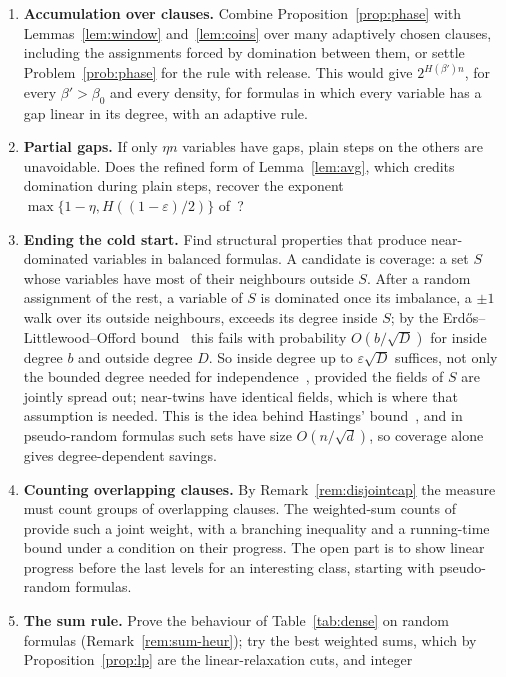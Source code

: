 \documentclass[11pt,a4paper]{article}
\theoremstyle{remark}
\begin{document}
\begin{enumerate}
 \item \textbf{Accumulation over clauses.} Combine
 Proposition~\ref{prop:phase} with Lemmas~\ref{lem:window} and~\ref{lem:coins}
 over many adaptively chosen clauses, including the assignments forced by
 domination between them, or settle Problem~\ref{prob:phase} for the rule with
 release. This would give $2^{H(\beta')n}$, for every $\beta'>\beta_0$ and every
 density, for formulas in which every variable has a gap linear in its degree,
 with an adaptive rule.
 \item \textbf{Partial gaps.} If only $\eta n$ variables have gaps, plain steps
 on the others are unavoidable. Does the refined form of Lemma~\ref{lem:avg},
 which credits domination during plain steps, recover the exponent
 $\max\{1-\eta,H((1-\varepsilon)/2)\}$ of~\cite[Theorem~11]{N3}?
 \item \textbf{Ending the cold start.} Find structural properties that produce
 near-dominated variables in balanced formulas. A candidate is coverage: a set
 $S$ whose variables have most of their neighbours outside $S$. After a random
 assignment of the rest, a variable of $S$ is dominated once its imbalance, a
 $\pm1$ walk over its outside neighbours, exceeds its degree inside $S$; by the
 Erd\H{o}s--Littlewood--Offord bound~\cite{Erd45} this fails with probability
 $O(b/\sqrt D)$ for inside degree $b$ and outside degree $D$. So inside degree
 up to $\varepsilon\sqrt D$ suffices, not only the bounded degree needed for
 independence~\cite{N5}, provided the fields of $S$ are jointly spread out;
 near-twins have identical fields, which is where that assumption is needed.
 This is the idea behind Hastings' bound~\cite{Has16}, and in pseudo-random
 formulas such sets have size $O(n/\sqrt d)$, so coverage alone gives
 degree-dependent savings.
 \item \textbf{Counting overlapping clauses.} By Remark~\ref{rem:disjointcap}
 the measure must count groups of overlapping clauses. The weighted-sum counts
 of~\cite{N5} provide such a joint weight, with a branching inequality and a
 running-time bound under a condition on their progress. The open part is to
 show linear progress before the last levels for an interesting class, starting
 with pseudo-random formulas.
 \item \textbf{The sum rule.} Prove the behaviour of Table~\ref{tab:dense} on
 random formulas (Remark~\ref{rem:sum-heur}); try the best weighted sums, which
 by Proposition~\ref{prop:lp} are the linear-relaxation cuts, and integer

\end{enumerate}
\end{document}
